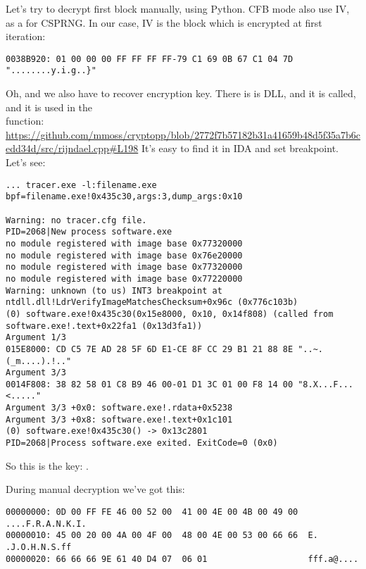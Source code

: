 Let's try to decrypt first block manually, using Python.
\ac{CFB} mode also use \ac{IV}, as a  for \ac{CSPRNG}.
In our case, \ac{IV} is the block which is encrypted at first iteration:

\begin{lstlisting}
0038B920: 01 00 00 00 FF FF FF FF-79 C1 69 0B 67 C1 04 7D "........y.i.g..}"
\end{lstlisting}

Oh, and we also have to recover encryption key.
There is  is DLL, and it is called, and it is used in the \\
 function:\\
\url{https://github.com/mmoss/cryptopp/blob/2772f7b57182b31a41659b48d5f35a7b6cedd34d/src/rijndael.cpp#L198}
It's easy to find it in IDA and set breakpoint. Let's see:

\begin{lstlisting}
... tracer.exe -l:filename.exe bpf=filename.exe!0x435c30,args:3,dump_args:0x10

Warning: no tracer.cfg file.
PID=2068|New process software.exe
no module registered with image base 0x77320000
no module registered with image base 0x76e20000
no module registered with image base 0x77320000
no module registered with image base 0x77220000
Warning: unknown (to us) INT3 breakpoint at ntdll.dll!LdrVerifyImageMatchesChecksum+0x96c (0x776c103b)
(0) software.exe!0x435c30(0x15e8000, 0x10, 0x14f808) (called from software.exe!.text+0x22fa1 (0x13d3fa1))
Argument 1/3
015E8000: CD C5 7E AD 28 5F 6D E1-CE 8F CC 29 B1 21 88 8E "..~.(_m....).!.."
Argument 3/3
0014F808: 38 82 58 01 C8 B9 46 00-01 D1 3C 01 00 F8 14 00 "8.X...F...<....."
Argument 3/3 +0x0: software.exe!.rdata+0x5238
Argument 3/3 +0x8: software.exe!.text+0x1c101
(0) software.exe!0x435c30() -> 0x13c2801
PID=2068|Process software.exe exited. ExitCode=0 (0x0)
\end{lstlisting}

So this is the key: .

During manual decryption we've got this:

\begin{lstlisting}
00000000: 0D 00 FF FE 46 00 52 00  41 00 4E 00 4B 00 49 00  ....F.R.A.N.K.I.
00000010: 45 00 20 00 4A 00 4F 00  48 00 4E 00 53 00 66 66  E. .J.O.H.N.S.ff
00000020: 66 66 66 9E 61 40 D4 07  06 01                    fff.a@....
\end{lstlisting}

